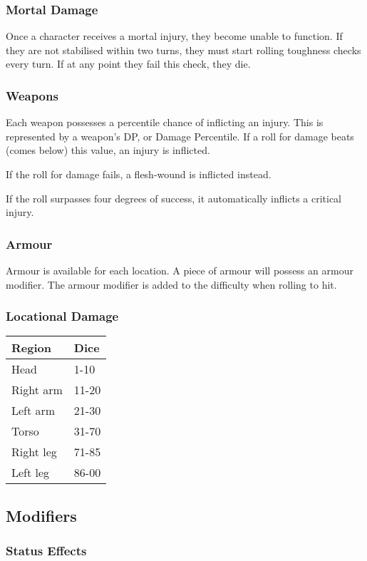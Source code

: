 \documentclass[]{article}
\begin{document}
\subsubsection{Mortal Damage}\label{mortal-damage}

Once a character receives a mortal injury, they become unable to
function. If they are not stabilised within two turns, they must start
rolling toughness checks every turn. If at any point they fail this
check, they die.

\subsubsection{Weapons}\label{weapons}

Each weapon possesses a percentile chance of inflicting an injury. This
is represented by a weapon's DP, or Damage Percentile. If a roll for
damage beats (comes below) this value, an injury is inflicted.

If the roll for damage fails, a flesh-wound is inflicted instead.

If the roll surpasses four degrees of success, it automatically inflicts
a critical injury.

\subsubsection{Armour}\label{armour}

Armour is available for each location. A piece of armour will possess an
armour modifier. The armour modifier is added to the difficulty when
rolling to hit.

\subsubsection{Locational Damage}\label{locational-damage}

\begin{longtable}[]{@{}ll@{}}
\toprule
Region & Dice\tabularnewline
\midrule
\endhead
Head & 1-10\tabularnewline
Right arm & 11-20\tabularnewline
Left arm & 21-30\tabularnewline
Torso & 31-70\tabularnewline
Right leg & 71-85\tabularnewline
Left leg & 86-00\tabularnewline
\bottomrule
\end{longtable}

\subsection{Modifiers}\label{modifiers}

\subsubsection{Status Effects}\label{status-effects}
\end{document}
